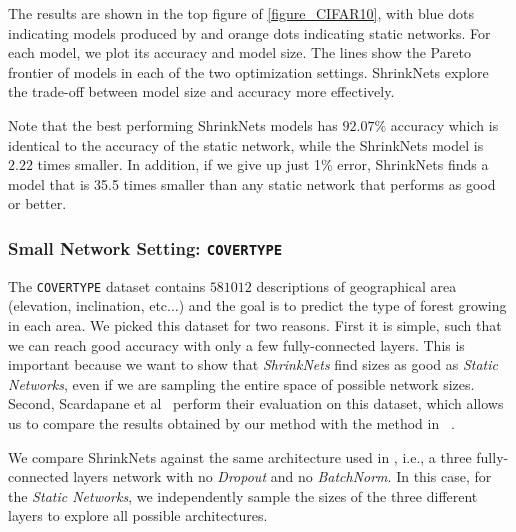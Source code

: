 The results are shown in the top figure of \cref{figure_CIFAR10}, with blue dots
indicating models produced by \shrink and orange dots indicating static networks. 
For each
model, we plot its accuracy and model size. The lines show the Pareto frontier
of models in each of the two optimization settings. ShrinkNets explore the
trade-off between model size and accuracy more effectively. 

Note that the best performing ShrinkNets models has $92.07\%$ accuracy which
is identical to the accuracy of the static network, while the ShrinkNets model
is $2.22$ times smaller. In addition, if we give up just 1\% error, ShrinkNets
finds a model that is 35.5 times smaller than any static network that performs
as good or better.

\subsubsection{Small Network Setting: \texttt{COVERTYPE}}

The \texttt{COVERTYPE} \cite{Blackard:1998:CNN:928509} dataset contains $581012$
descriptions of geographical area (elevation, inclination, etc...) and the goal
is to predict the type of forest growing in each area. We picked this dataset
for two reasons. First it is simple, such that we can reach good accuracy with
only a few fully-connected layers. This is important because we want to show
that \textit{ShrinkNets} find sizes as good as \textit{Static Networks}, even if
we are sampling the entire space of possible network sizes. Second, Scardapane
et al~\cite{Scardapane2017} perform their evaluation on this dataset, which
allows us to compare the results obtained by our method with the method in
~\cite{Scardapane2017}.

We compare ShrinkNets against the same architecture
used in \cite{Scardapane2017}, i.e., a three fully-connected layers network with no
\textit{Dropout} \cite{Srivastava2014} and no \textit{BatchNorm}. 
In this case, for the \textit{Static Networks}, we independently sample the
sizes of the three different layers to explore all possible architectures.

